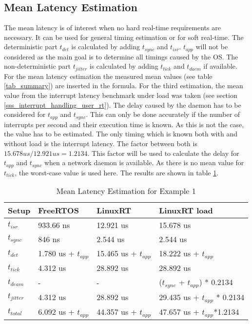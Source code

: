 \subsection{Mean Latency Estimation}\label{sss_mean_latency_estimation}
The mean latency is of interest when no hard real-time requirements are necessary. 
It can be used for general timing estimation or for soft real-time.
The deterministic part $t_{det}$ is calculated by adding $t_{sync}$ and $t_{isr}$.
$t_{app}$ will not be considered as the main goal is to determine all timings caused by the \ac{OS}.
The non-deterministic part $t_{jitter}$ is calculated by adding $t_{tick}$ and $t_{daem}$ if available.
For the mean latency estimation the measured mean values (see table \ref{tab_summary}) are inserted in the formula.
For the third estimation, the mean value from the interrupt latency benchmark under load was taken (see section \ref{sss_interrupt_handling_user_rt}).
The delay caused by the daemon has to be considered for $t_{app}$ and $t_{sync}$.
This can only be done accurately if the number of interrupts per second and their execution time is known.
As this is not the case, the value has to be estimated.
The only timing which is known both with and without load is the interrupt latency.
The factor between both is $15.678 us / 12.921 us = 1.2134 $.   
This factor will be used to calculate the delay for $t_{app}$ and $t_{sync}$ when a network daemon is available.
As there is no mean value for $t_{tick}$, the worst-case value is used here. 
The results are shown in table \ref{tab_example1_mean}.
\begin{table}[htbp]
	\centering
		\begin{tabular}{|l|l|l|l|}
			\hline
				Setup					& FreeRTOS 								& LinuxRT 							& LinuxRT load  \\
				\hline 
				$t_{isr}$ 		& 933.66 ns 							& 12.921 us 						& 15.678 us			\\
			  $t_{sync}$		& 846 ns	  							& 2.544 us 				 			& 2.544 us			\\
			  \hline 
			  $t_{det}$			& 1.780 us + $t_{app}$		& 15.465 us + $t_{app}$	& 18.222 us	+ $t_{app}$		\\ 
			  \hline
			  \hline
			  $t_{tick}$		& 4.312 us								& 28.892 us 					  & 28.892 us											\\
			  $t_{deam}$		& -				  							& - 				 						& ($t_{sync}$ + $t_{app}$) * 0.2134 \\ 
				\hline 
			  $t_{jitter}$	& 4.312 us  							& 28.892 us						  & 29.435 us	+ $t_{app}$ * 0.2134	\\ 
			  \hline
			  \hline 
			  $t_{total}$		& 6.092 us + $t_{app}$	 & 44.357 us + $t_{app}$  &	47.657 us + $t_{app}$*1.2134 	\\ 
			\hline
		\end{tabular}
	\caption{Mean Latency Estimation for Example 1}
	\label{tab_example1_mean}
\end{table}

